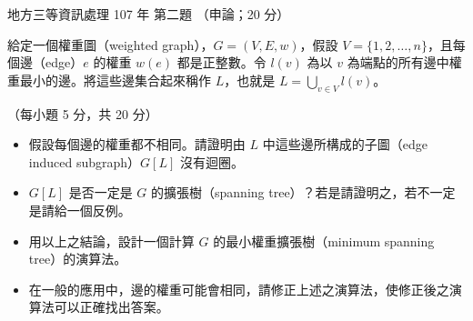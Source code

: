 \begin{pastexam}[label={px:df3-107-ds-02}]{地方三等資訊處理 107 年 第二題}
（申論；20 分）

給定一個權重圖（weighted graph），$G=(V, E, w)$，假設 $V = \{1, 2,\ldots,n\}$，且每個邊（edge）$e$ 的權重 $w(e)$ 都是正整數。令 $l(v)$ 為以 $v$ 為端點的所有邊中權重最小的邊。將這些邊集合起來稱作 $L$，也就是 $L = \bigcup\limits_{v\in V} l(v)$。

（每小題 5 分，共 20 分）
\begin{itemize}[leftmargin=2.2em]
\item[㈠] 假設每個邊的權重都不相同。請證明由 $L$ 中這些邊所構成的子圖（edge induced subgraph）$G[L]$ 沒有迴圈。
\item[㈡] $G[L]$ 是否一定是 $G$ 的擴張樹（spanning tree）？若是請證明之，若不一定是請給一個反例。
\item[㈢] 用以上之結論，設計一個計算 $G$ 的最小權重擴張樹（minimum spanning tree）的演算法。
\item[㈣] 在一般的應用中，邊的權重可能會相同，請修正上述之演算法，使修正後之演算法可以正確找出答案。
\end{itemize}
\end{pastexam}

